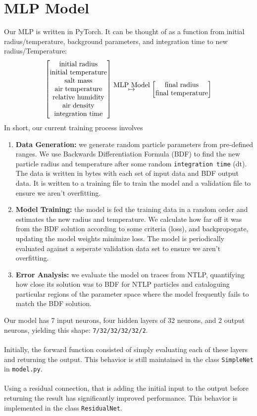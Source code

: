 \documentclass{article}
\newcommand\overscript[2]{\stackrel{{\normalfont\mbox{#1}}}{#2}}
\begin{document}
\section{MLP Model}
Our MLP is written in PyTorch. It can be thought of as a function from initial radius/temperature, background parameters, and integration time to new radius/Temperature:
\[
	\begin{bmatrix}
		\text{initial radius}\\
		\text{initial temperature}\\
		\text{salt mass}\\
		\text{air temperature}\\
		\text{relative humidity}\\
		\text{air density}\\
		\text{integration time}
	\end{bmatrix}
	\overscript{\text{MLP Model}}{\mapsto}
	\begin{bmatrix} 
		\text{final radius}\\
		\text{final temperature}
	\end{bmatrix}
\]
In short, our current training process involves
\begin{enumerate}
	\item \textbf{Data Generation:} we generate random particle parameters from pre-defined ranges. We use Backwards Differentiation Formula (BDF) to find the new particle radius and temperature after some random \lstinline{integration time} (dt). The data is written in bytes with each set of input data and BDF output data. It is written to a training file to train the model and a validation file to ensure we aren't overfitting.
	\item \textbf{Model Training:} the model is fed the training data in a random order and estimates the new radius and temperature. We calculate how far off it was from the BDF solution according to some criteria (loss), and backpropogate, updating the model weights minimize loss. The model is periodically evaluated against a seperate validation data set to ensure we aren't overfitting.
	\item \textbf{Error Analysis:} we evaluate the model on traces from NTLP, quantifying how close its solution was to BDF for NTLP particles and cataloguing particular regions of the parameter space where the model frequently fails to match the BDF solution.
\end{enumerate}
Our model has 7 input neurons, four hidden layers of 32 neurons, and 2 output neurons, yielding this shape: \lstinline{7/32/32/32/32/2}.\\\\
Initially, the forward function consisted of simply evaluating each of these layers and returning the output. This behavior is still maintained in the class \lstinline{SimpleNet} in \lstinline{model.py}.\\\\
Using a residual connection, that is adding the initial input to the output before returning the result has significantly improved performance. This behavior is implemented in the class \lstinline{ResidualNet}.\\\\
\end{document}
